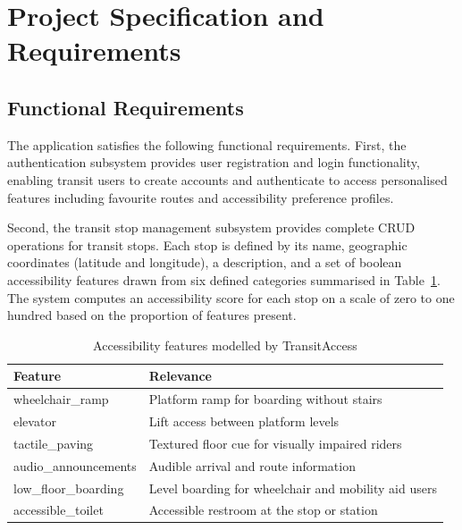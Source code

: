 \documentclass[conference]{IEEEtran}
\begin{document}
\section{Project Specification and Requirements}

\subsection{Functional Requirements}

The application satisfies the following functional requirements. First, the authentication subsystem provides user registration and login functionality, enabling transit users to create accounts and authenticate to access personalised features including favourite routes and accessibility preference profiles.

Second, the transit stop management subsystem provides complete CRUD operations for transit stops. Each stop is defined by its name, geographic coordinates (latitude and longitude), a description, and a set of boolean accessibility features drawn from six defined categories summarised in Table~\ref{tab:features}. The system computes an accessibility score for each stop on a scale of zero to one hundred based on the proportion of features present.

\begin{table}[H]
\centering
\caption{Accessibility features modelled by TransitAccess}
\label{tab:features}
\renewcommand{\arraystretch}{1.2}
\begin{tabularx}{\columnwidth}{|l|X|}
\hline
\textbf{Feature} & \textbf{Relevance} \\
\hline
wheelchair\_ramp & Platform ramp for boarding without stairs \\
\hline
elevator & Lift access between platform levels \\
\hline
tactile\_paving & Textured floor cue for visually impaired riders \\
\hline
audio\_announcements & Audible arrival and route information \\
\hline
low\_floor\_boarding & Level boarding for wheelchair and mobility aid users \\
\hline
accessible\_toilet & Accessible restroom at the stop or station \\
\hline
\end{tabularx}
\end{table}
\end{document}
